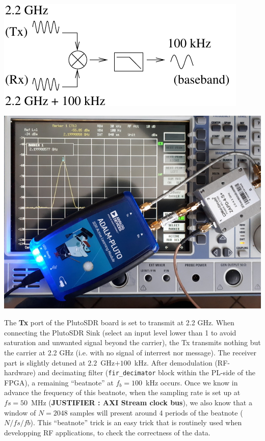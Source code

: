 \documentclass[12pt,oneside]{article}
\begin{document}
\begin{minipage}[c]{0.49\linewidth}
	\includegraphics[width=\linewidth]{beatnote_pluto_scheme.pdf}
\end{minipage}\hfill
\begin{minipage}[c]{0.49\linewidth}
	\includegraphics[width=\linewidth]{20190213_105039_640.jpg}
\end{minipage}

The {\bf Tx} port of the PlutoSDR board is set to transmit at 2.2 GHz. When connecting
the PlutoSDR Sink (select an input level lower than 1 to avoid saturation and 
unwanted signal beyond the carrier), the Tx transmits nothing but the carrier at 2.2 GHz 
(i.e. with no signal of interrest nor message). The receiver part is slightly detuned at 
$2.2$~GHz$+100$~kHz. After demodulation (RF-hardware) and decimating filter ({\tt fir\_decimator}
block within the PL-side of the FPGA), a remaining ``beatnote'' at $f_b=100$~kHz occurs.
Once we know in advance the frequency of this beatnote, when the sampling rate
is set up at $fs=50$~MHz ({\bf JUSTIFIER : AXI Stream clock bus}), we also know that a window 
of $N=2048$ samples will present around 4 periods of the beatnote ($N/fs/fb$).
This ``beatnote'' trick is  an easy trick that is routinely used when developping
RF applications, to check the correctness of the data.
\end{document}
